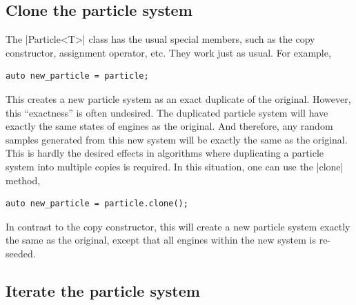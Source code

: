 \subsection{Clone the particle system}
\label{sub:Clone the particle system}

The |Particle<T>| class has the usual special members, such as the copy
constructor, assignment operator, etc. They work just as usual. For example,
\begin{Verbatim}
auto new_particle = particle;
\end{Verbatim}
This creates a new particle system as an exact duplicate of the original.
However, this ``exactness'' is often undesired. The duplicated particle system
will have exactly the same states of \rng engines as the original. And
therefore, any random samples generated from this new system will be exactly
the same as the original. This is hardly the desired effects in algorithms
where duplicating a particle system into multiple copies is required. In this
situation, one can use the |clone| method,
\begin{Verbatim}
auto new_particle = particle.clone();
\end{Verbatim}
In contrast to the copy constructor, this will create a new particle system
exactly the same as the original, except that all \rng engines within the new
system is re-seeded.

\subsection{Iterate the particle system}
\label{sub:Iterate the particle system}

